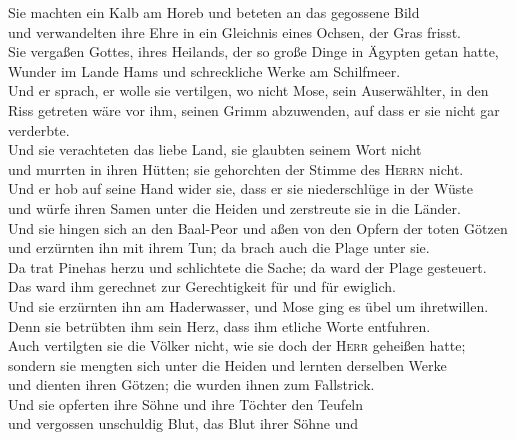  Sie machten ein Kalb am Horeb und beteten an das
gegossene Bild\\
 und verwandelten ihre Ehre in ein Gleichnis eines
Ochsen, der Gras frisst.\\
 Sie vergaßen Gottes, ihres Heilands, der so große Dinge
in Ägypten getan hatte,\\
 Wunder im Lande Hams und schreckliche Werke am
Schilfmeer.\\
 Und er sprach, er wolle sie vertilgen, wo nicht Mose,
sein Auserwählter, in den Riss getreten wäre vor ihm, seinen Grimm
abzuwenden, auf dass er sie nicht gar verderbte.\\
 Und sie verachteten das liebe Land, sie glaubten seinem
Wort nicht\\
 und murrten in ihren Hütten; sie gehorchten der Stimme
des \textsc{Herrn} nicht.\\
 Und er hob auf seine Hand wider sie, dass er sie
niederschlüge in der Wüste\\
 und würfe ihren Samen unter die Heiden und zerstreute
sie in die Länder.\\
 Und sie hingen sich an den Baal-Peor und aßen von den
Opfern der toten Götzen\\
 und erzürnten ihn mit ihrem Tun; da brach auch die Plage
unter sie.\\
 Da trat Pinehas herzu und schlichtete die Sache; da ward
der Plage gesteuert.\\
 Das ward ihm gerechnet zur Gerechtigkeit für und für
ewiglich.\\
 Und sie erzürnten ihn am Haderwasser, und Mose ging es
übel um ihretwillen.\\
 Denn sie betrübten ihm sein Herz, dass ihm etliche Worte
entfuhren.\\
 Auch vertilgten sie die Völker nicht, wie sie doch der
\textsc{Herr} geheißen hatte;\\
 sondern sie mengten sich unter die Heiden und lernten
derselben Werke\\
 und dienten ihren Götzen; die wurden ihnen zum
Fallstrick.\\
 Und sie opferten ihre Söhne und ihre Töchter den
Teufeln\\
 und vergossen unschuldig Blut, das Blut ihrer Söhne und
